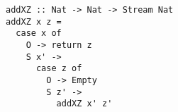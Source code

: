 \begin{figure}[!t]
  \centering
  \begin{minipage}{\columnwidth}
    \begin{lstlisting}[label={add_x_z}, caption={Function for \lstinline{addo in out in} direction}, captionpos=b, frame=tb]
addXZ :: Nat -> Nat -> Stream Nat
addXZ x z =
  case x of
    O -> return z
    S x' ->
      case z of
        O -> Empty
        S z' ->
          addXZ x' z'
    \end{lstlisting}
  \end{minipage}
\end{figure}
